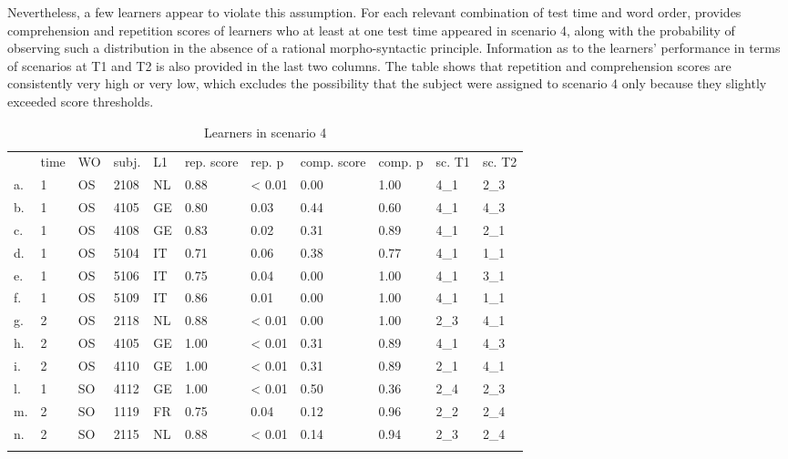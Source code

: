 Nevertheless, a few learners appear to violate this assumption. For each relevant combination of test time and word order,  provides comprehension and repetition scores of learners who at least at one test time appeared in scenario 4, along with the probability of observing such a distribution in the absence of a rational morpho-syntactic principle. Information as to the learners' performance in terms of scenarios at T1 and T2 is also provided in the last two columns. The table shows that repetition and comprehension scores are consistently very high or very low, which excludes the possibility that the subject were assigned to scenario 4 only because they slightly exceeded score thresholds. 

\begin{table}
    \begin{tabularx}{\textwidth}{XXXXXXXXXXX}
         & time & WO & subj. & L1 & rep. score & rep. p & comp. score & comp. p & sc. T1 & sc. T2\\
        \lsptoprule
        a. & 1 & OS & 2108 & NL & 0.88 & < 0.01 & 0.00 & 1.00 & 4\_1 & 2\_3\\
        b. & 1 & OS & 4105 & GE & 0.80 & 0.03 & 0.44 & 0.60 & 4\_1 & 4\_3\\
        c. & 1 & OS & 4108 & GE & 0.83 & 0.02 & 0.31 & 0.89 & 4\_1 & 2\_1\\
        d. & 1 & OS & 5104 & IT & 0.71 & 0.06 & 0.38 & 0.77 & 4\_1 & 1\_1\\
        e. & 1 & OS & 5106 & IT & 0.75 & 0.04 & 0.00 & 1.00 & 4\_1 & 3\_1\\
        f. & 1 & OS & 5109 & IT & 0.86 & 0.01 & 0.00 & 1.00 & 4\_1 & 1\_1\\
        g. & 2 & OS & 2118 & NL & 0.88 & < 0.01 & 0.00 & 1.00 & 2\_3 & 4\_1\\
        h. & 2 & OS & 4105 & GE & 1.00 & < 0.01 & 0.31 & 0.89 & 4\_1 & 4\_3\\
        i. & 2 & OS & 4110 & GE & 1.00 & < 0.01 & 0.31 & 0.89 & 2\_1 & 4\_1\\
        l. & 1 & SO & 4112 & GE & 1.00 & < 0.01 & 0.50 & 0.36 & 2\_4 & 2\_3\\
        m. & 2 & SO & 1119 & FR & 0.75 & 0.04 & 0.12 & 0.96 & 2\_2 & 2\_4\\
        n. & 2 & SO & 2115 & NL & 0.88 & < 0.01 & 0.14 & 0.94 & 2\_3 & 2\_4\\
        \lspbottomrule
    \end{tabularx}
    \caption{Learners in scenario 4}
    \label{tab:06:8}
\end{table}

